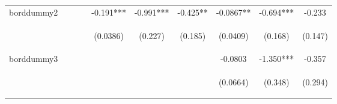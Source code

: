 \documentclass[]{article}
\begin{document}
\begin{center}
\begin{tabular}{lccccccccc}
borddummy2 &  &  &  & -0.191*** & -0.991*** & -0.425** & -0.0867** & -0.694*** & -0.233 \\
\vspace{4pt} & \begin{footnotesize}\end{footnotesize} & \begin{footnotesize}\end{footnotesize} & \begin{footnotesize}\end{footnotesize} & \begin{footnotesize}(0.0386)\end{footnotesize} & \begin{footnotesize}(0.227)\end{footnotesize} & \begin{footnotesize}(0.185)\end{footnotesize} & \begin{footnotesize}(0.0409)\end{footnotesize} & \begin{footnotesize}(0.168)\end{footnotesize} & \begin{footnotesize}(0.147)\end{footnotesize} \\
borddummy3 &  &  &  &  &  &  & -0.0803 & -1.350*** & -0.357 \\
\vspace{4pt} & \begin{footnotesize}\end{footnotesize} & \begin{footnotesize}\end{footnotesize} & \begin{footnotesize}\end{footnotesize} & \begin{footnotesize}\end{footnotesize} & \begin{footnotesize}\end{footnotesize} & \begin{footnotesize}\end{footnotesize} & \begin{footnotesize}(0.0664)\end{footnotesize} & \begin{footnotesize}(0.348)\end{footnotesize} & \begin{footnotesize}(0.294)\end{footnotesize} \\

\end{tabular}
\end{center}
\end{document}
